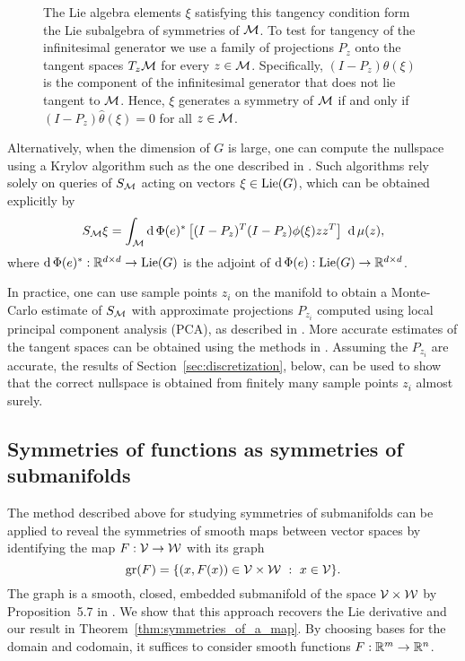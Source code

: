 \documentclass[twoside,11pt]{article}
\begin{document}
\begin{figure}
{    The Lie algebra elements $\xi$ satisfying this tangency condition form the Lie subalgebra of symmetries of ${\mathcal{M}}$. 
    To test for tangency of the infinitesimal generator we use a family of projections $P_z$ onto the tangent spaces $T_z {\mathcal{M}}$ for every $z\in{\mathcal{M}}$.
    Specifically, $(I - P_z) \hat{\theta}(\xi)$ is the component of the infinitesimal generator that does not lie tangent to ${\mathcal{M}}$. 
    Hence, $\xi$ generates a symmetry of ${\mathcal{M}}$ if and only if $(I - P_z) \hat{\theta}(\xi) = 0$ for all $z\in{\mathcal{M}}$.}
    \label{fig:manifold_tangent_symmetry}
\end{figure}

Alternatively, when the dimension of $G$ is large, one can compute the nullspace using a Krylov algorithm such as the one described in \cite{Finzi2021practical}.
Such algorithms rely solely on queries of $S_{{\mathcal{M}}}$ acting on vectors $\xi\in\operatorname{Lie}(G)$, which can be obtained explicitly by
\begin{equation}
    S_{{\mathcal{M}}} \xi = \int_{{\mathcal{M}}} \operatorname{\mathrm{d}}\Phi(e)^*\left[ (I-P_z)^T (I-P_z) \phi(\xi) z z^T \right] \ \operatorname{\mathrm{d}} \mu(z),
\end{equation}
where $\operatorname{\mathrm{d}}\Phi(e)^*:\mathbb{R}^{d\times d} \to \operatorname{Lie}(G)$ is the adjoint of $\operatorname{\mathrm{d}}\Phi(e):\operatorname{Lie}(G) \to \mathbb{R}^{d\times d}$.

In practice, one can use sample points $z_i$ on the manifold to obtain a Monte-Carlo estimate of $S_{{\mathcal{M}}}$ with approximate projections $P_{z_i}$ computed using local principal component analysis (PCA), as described in \cite{Cahill2023Lie}.
More accurate estimates of the tangent spaces can be obtained using the methods in \cite{Berry2020spectral}.
Assuming the $P_{z_i}$ are accurate, the results of Section~\ref{sec:discretization}, below, can be used to show that the correct nullspace is obtained from finitely many sample points $z_i$ almost surely.

\subsection{Symmetries of functions as symmetries of submanifolds}
\label{eqn:functions_as_submanifolds}

The method described above for studying symmetries of submanifolds can be applied to reveal the symmetries of smooth maps between vector spaces by identifying the map $F:{\mathcal{V}} \to {\mathcal{W}}$ with its graph
\begin{equation}
    \operatorname{gr}(F) = \{ (x, F(x)) \in {\mathcal{V}}\times{\mathcal{W}} \ : \ x \in {\mathcal{V}} \}.
\end{equation}
The graph is a smooth, closed, embedded submanifold of the space ${\mathcal{V}}\times {\mathcal{W}}$ by Proposition~5.7 in \cite{Lee2013introduction}.
We show that this approach recovers the Lie derivative and our result in Theorem~\ref{thm:symmetries_of_a_map}.
By choosing bases for the domain and codomain, it suffices to consider smooth functions $F:\mathbb{R}^m\to\mathbb{R}^n$.
\end{document}
